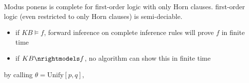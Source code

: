  Modus ponens is complete for first-order logic with only Horn clauses.
 first-order logic (even restricted to only Horn
clauses) is semi-deciable.
\begin{itemize}
    \item if $KB \models f$, forward inference on complete inference rules will prove $f$ in finite time
    \item if $KB \nrightmodels f$, no algorithm can show this in finite time
\end{itemize}

 by calling $\theta = \text{Unify}[p,q]$,
